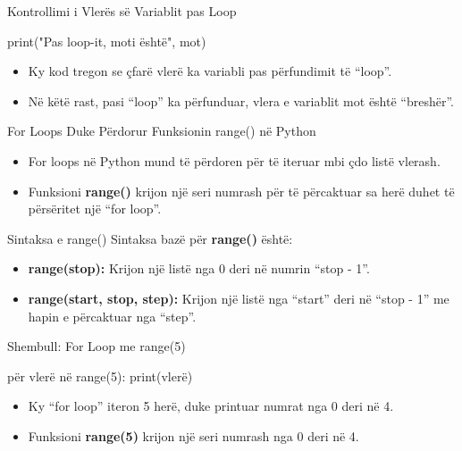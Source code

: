 \documentclass[
  ignorenonframetext,
]{beamer}
\newenvironment{Shaded}{\begin{snugshade}}{\end{snugshade}}
\newcommand{\BuiltInTok}[1]{#1}
\newcommand{\DecValTok}[1]{\textcolor[rgb]{0.00,0.00,0.81}{#1}}
\newcommand{\NormalTok}[1]{#1}
\newcommand{\StringTok}[1]{\textcolor[rgb]{0.31,0.60,0.02}{#1}}
\begin{document}
\begin{frame}[fragile]{Kontrollimi i Vlerës së Variablit pas Loop}
\protect\hypertarget{kontrollimi-i-vleruxebs-suxeb-variablit-pas-loop}{}
\begin{Shaded}
\begin{Highlighting}[]
\BuiltInTok{print}\NormalTok{(}\StringTok{"Pas loop{-}it, moti është"}\NormalTok{, mot)}
\end{Highlighting}
\end{Shaded}

\begin{itemize}
\item
  Ky kod tregon se çfarë vlerë ka variabli pas përfundimit të ``loop''.
\item
  Në këtë rast, pasi ``loop'' ka përfunduar, vlera e variablit mot është
  ``breshër''.
\end{itemize}
\end{frame}

\begin{frame}{For Loops Duke Përdorur Funksionin range() në Python}
\protect\hypertarget{for-loops-duke-puxebrdorur-funksionin-range-nuxeb-python}{}
\begin{itemize}
\item
  For loops në Python mund të përdoren për të iteruar mbi çdo listë
  vlerash.
\item
  Funksioni \textbf{range()} krijon një seri numrash për të përcaktuar
  sa herë duhet të përsëritet një ``for loop''.
\end{itemize}
\end{frame}

\begin{frame}{Sintaksa e range()}
\protect\hypertarget{sintaksa-e-range}{}
Sintaksa bazë për \textbf{range()} është:

\begin{itemize}
\item
  \textbf{range(stop):} Krijon një listë nga 0 deri në numrin ``stop -
  1''.
\item
  \textbf{range(start, stop, step):} Krijon një listë nga ``start'' deri
  në ``stop - 1'' me hapin e përcaktuar nga ``step''.
\end{itemize}
\end{frame}

\begin{frame}[fragile]{Shembull: For Loop me range(5)}
\protect\hypertarget{shembull-for-loop-me-range5}{}
\begin{Shaded}
\begin{Highlighting}[]
\NormalTok{për vlerë në }\BuiltInTok{range}\NormalTok{(}\DecValTok{5}\NormalTok{):}
    \BuiltInTok{print}\NormalTok{(vlerë)}
\end{Highlighting}
\end{Shaded}

\begin{itemize}
\item
  Ky ``for loop'' iteron 5 herë, duke printuar numrat nga 0 deri në 4.
\item
  Funksioni \textbf{range(5)} krijon një seri numrash nga 0 deri në 4.
\end{itemize}
\end{frame}
\end{document}
